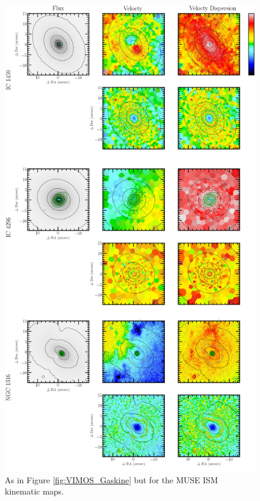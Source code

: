	\begin{figure}
		\centering
		\includegraphics[height=0.94\textheight]{chapter4/muse/kin1.png}
		\caption[MUSE ISM kinematic maps]{As in Figure \ref{fig:VIMOS_Gaskine} but for the MUSE ISM kinematic maps.}
		\label{fig:MUSE_Gaskine}
	\end{figure}













